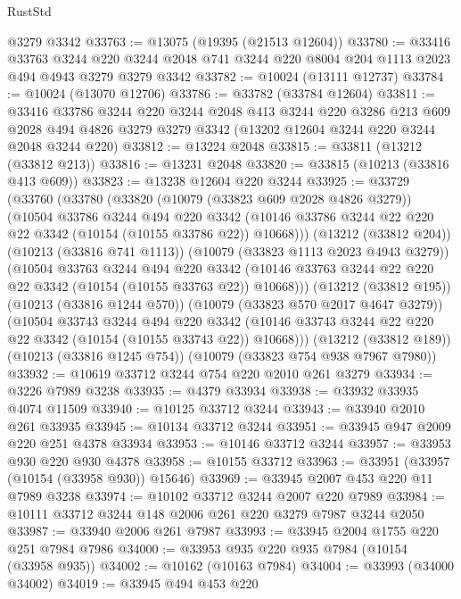 \begin{lexlean}{RustStd}
\begin{coremodule}
    @3279
    @3342
@33763 := @13075 (@19395 (@21513 @12604))
@33780 := @33416
    @33763
    @3244
    @220
    @3244
    @2048
    @741
    @3244
    @220
    @8004
    @204
    @1113
    @2023
    @494
    @4943
    @3279
    @3279
    @3342
@33782 := @10024 (@13111 @12737)
@33784 := @10024 (@13070 @12706)
@33786 := @33782 (@33784 @12604)
@33811 := @33416
    @33786
    @3244
    @220
    @3244
    @2048
    @413
    @3244
    @220
    @3286
    @213
    @609
    @2028
    @494
    @4826
    @3279
    @3279
    @3342
    (@13202 @12604 @3244 @220 @3244 @2048 @3244 @220)
@33812 := @13224 @2048
@33815 := @33811 (@13212 (@33812 @213))
@33816 := @13231 @2048
@33820 := @33815 (@10213 (@33816 @413 @609))
@33823 := @13238 @12604 @220 @3244
@33925 := @33729
    (@33760
      (@33780
        (@33820
          (@10079 (@33823 @609 @2028 @4826 @3279))
          (@10504
            @33786
            @3244
            @494
            @220
            @3342
            (@10146 @33786 @3244 @22 @220 @22 @3342 (@10154 (@10155 @33786 @22)) @10668)))
        (@13212 (@33812 @204))
        (@10213 (@33816 @741 @1113))
        (@10079 (@33823 @1113 @2023 @4943 @3279))
        (@10504
          @33763
          @3244
          @494
          @220
          @3342
          (@10146 @33763 @3244 @22 @220 @22 @3342 (@10154 (@10155 @33763 @22)) @10668)))
      (@13212 (@33812 @195))
      (@10213 (@33816 @1244 @570))
      (@10079 (@33823 @570 @2017 @4647 @3279))
      (@10504
        @33743
        @3244
        @494
        @220
        @3342
        (@10146 @33743 @3244 @22 @220 @22 @3342 (@10154 (@10155 @33743 @22)) @10668)))
    (@13212 (@33812 @189))
    (@10213 (@33816 @1245 @754))
    (@10079 (@33823 @754 @938 @7967 @7980))
@33932 := @10619 @33712 @3244 @754 @220 @2010 @261 @3279
@33934 := @3226 @7989 @3238
@33935 := @4379 @33934
@33938 := @33932 @33935 @4074 @11509
@33940 := @10125 @33712 @3244
@33943 := @33940 @2010 @261 @33935
@33945 := @10134 @33712 @3244
@33951 := @33945 @947 @2009 @220 @251 @4378 @33934
@33953 := @10146 @33712 @3244
@33957 := @33953 @930 @220 @930 @4378
@33958 := @10155 @33712
@33963 := @33951 (@33957 (@10154 (@33958 @930)) @15646)
@33969 := @33945 @2007 @453 @220 @11 @7989 @3238
@33974 := @10102 @33712 @3244 @2007 @220 @7989
@33984 := @10111 @33712 @3244 @148 @2006 @261 @220 @3279 @7987 @3244 @2050
@33987 := @33940 @2006 @261 @7987
@33993 := @33945 @2004 @1755 @220 @251 @7984 @7986
@34000 := @33953 @935 @220 @935 @7984 (@10154 (@33958 @935))
@34002 := @10162 (@10163 @7984)
@34004 := @33993 (@34000 @34002)
@34019 := @33945
    @494
    @453
    @220

\end{coremodule}
\end{lexlean}

